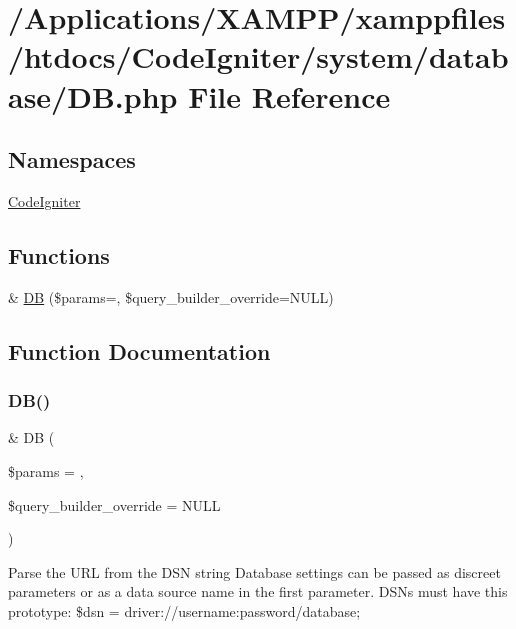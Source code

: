 \hypertarget{_d_b_8php}{}\section{/\+Applications/\+X\+A\+M\+P\+P/xamppfiles/htdocs/\+Code\+Igniter/system/database/\+DB.php File Reference}
\label{_d_b_8php}
\subsection*{Namespaces}
\begin{DoxyCompactItemize}
\item 
 \mbox{\hyperlink{namespace_code_igniter}{Code\+Igniter}}
\end{DoxyCompactItemize}
\subsection*{Functions}
\begin{DoxyCompactItemize}
\item 
\& \mbox{\hyperlink{_d_b_8php_a3faf383c8f1087c53bac95e803afed93}{DB}} (\$params=\textquotesingle{}\textquotesingle{}, \$query\+\_\+builder\+\_\+override=N\+U\+LL)
\end{DoxyCompactItemize}


\subsection{Function Documentation}
\mbox{\label{_d_b_8php_a3faf383c8f1087c53bac95e803afed93}} 
\subsubsection{\texorpdfstring{D\+B()}{DB()}}
{\footnotesize\ttfamily \& DB (\begin{DoxyParamCaption}\item[{}]{\$params = {\ttfamily \textquotesingle{}\textquotesingle{}},  }\item[{}]{\$query\+\_\+builder\+\_\+override = {\ttfamily NULL} }\end{DoxyParamCaption})}

Parse the U\+RL from the D\+SN string Database settings can be passed as discreet parameters or as a data source name in the first parameter. D\+S\+Ns must have this prototype\+: \$dsn = \textquotesingle{}driver\+://username\+:password/database\textquotesingle{};

